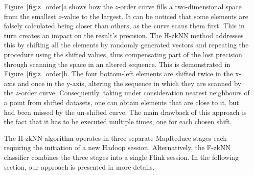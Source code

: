Figure~\ref{fig:z_order}a shows how the $z$-order curve fills a two-dimensional space from the smallest $z$-value to the largest. It can be noticed that some elements are falsely calculated being closer than others, as the curve scans them first. This in turn creates an impact on the result's precision. The H-zkNN method addresses this by shifting all the elements by randomly generated vectors and repeating the procedure using the shifted values, thus compensating part of the lost precision through scanning the space in an altered sequence. This is demonstrated in Figure~\ref{fig:z_order}b. The four bottom-left elements are shifted twice in the x-axis and once in the y-axis, altering the sequence in which they are scanned by the $z$-order curve. Consequently, taking under consideration nearest neighbours of a point from shifted datasets, one can obtain elements that are close to it, but had been missed by the un-shifted curve. The main drawback of this approach is the fact that it has to be executed multiple times, one for each chosen shift.

The H-zkNN algorithm operates in three separate MapReduce stages each requiring the initiation of a new Hadoop session. Alternatively, the F-zkNN classifier combines the three stages into a single Flink session. In the following section, our approach is presented in more details.